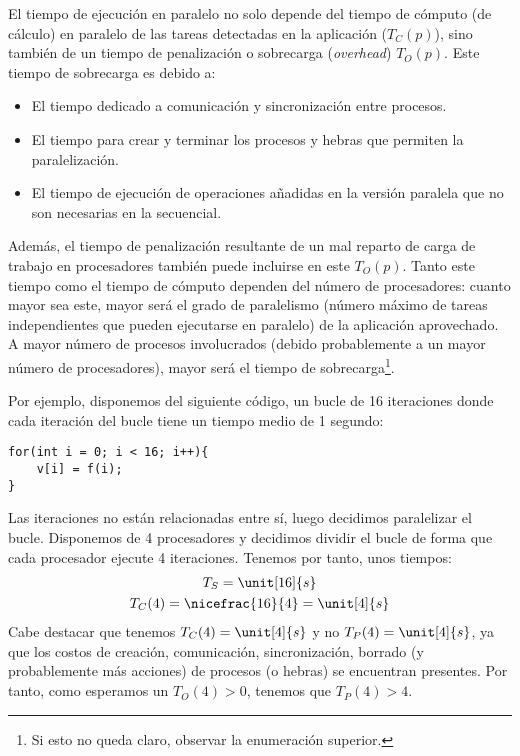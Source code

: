 El tiempo de ejecución en paralelo no solo depende del tiempo de cómputo (de cálculo) en paralelo de las tareas detectadas en la aplicación ($T_C(p)$), sino también de un tiempo de penalización o sobrecarga (\emph{overhead}) $T_O(p)$. Este tiempo de sobrecarga es debido a:
\begin{itemize}
    \item El tiempo dedicado a comunicación y sincronización entre procesos.
    \item El tiempo para crear y terminar los procesos y hebras que permiten la paralelización.
    \item El tiempo de ejecución de operaciones añadidas en la versión paralela que no son necesarias en la secuencial.
\end{itemize}
Además, el tiempo de penalización resultante de un mal reparto de carga de trabajo en procesadores también puede incluirse en este $T_O(p)$.
Tanto este tiempo como el tiempo de cómputo dependen del número de procesadores: cuanto mayor sea este, mayor será el grado de paralelismo (número máximo de tareas independientes que pueden ejecutarse en paralelo) de la aplicación aprovechado. A mayor número de procesos involucrados (debido probablemente a un mayor número de procesadores), mayor será el tiempo de sobrecarga\footnote{Si esto no queda claro, observar la enumeración superior.}.

\begin{ejemplo}
    Por ejemplo, disponemos del siguiente código, un bucle de 16 iteraciones donde cada iteración del bucle tiene un tiempo medio de 1 segundo:
    \begin{verbatim}
for(int i = 0; i < 16; i++){
    v[i] = f(i);
}
    \end{verbatim}
    Las iteraciones no están relacionadas entre sí, luego decidimos paralelizar el bucle. Disponemos de 4 procesadores y decidimos dividir el bucle de forma que cada procesador ejecute 4 iteraciones. Tenemos por tanto, unos tiempos:
    \begin{gather*}
        T_S = \unit[16]{s} \\
        T_C(4) = \nicefrac{16}{4} = \unit[4]{s}
    \end{gather*}
    Cabe destacar que tenemos $T_C(4)=\unit[4]{s}$ y no $T_P(4)=\unit[4]{s}$, ya que los costos de creación, comunicación, sincronización, borrado (y probablemente más acciones) de procesos (o hebras) se encuentran presentes. Por tanto, como esperamos un $T_O(4) > 0$, tenemos que $T_P(4) > 4$.
\end{ejemplo}

